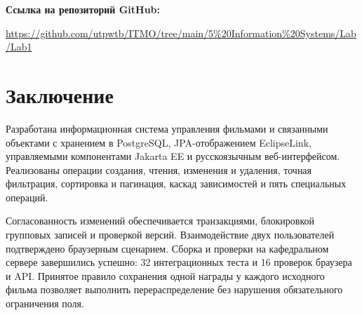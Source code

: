 \noindent\textbf{Ссылка на репозиторий GitHub:}\par
\noindent\url{https://github.com/utpwtb/ITMO/tree/main/5%20Information%20Systems/Lab/Lab1}

\section{Заключение}

Разработана информационная система управления фильмами и связанными объектами с хранением в PostgreSQL, JPA-отображением EclipseLink, управляемыми компонентами Jakarta EE и русскоязычным веб-интерфейсом. Реализованы операции создания, чтения, изменения и удаления, точная фильтрация, сортировка и пагинация, каскад зависимостей и пять специальных операций.

Согласованность изменений обеспечивается транзакциями, блокировкой групповых записей и проверкой версий. Взаимодействие двух пользователей подтверждено браузерным сценарием. Сборка и проверки на кафедральном сервере завершились успешно: 32 интеграционных теста и 16 проверок браузера и API. Принятое правило сохранения одной награды у каждого исходного фильма позволяет выполнить перераспределение без нарушения обязательного ограничения поля.
